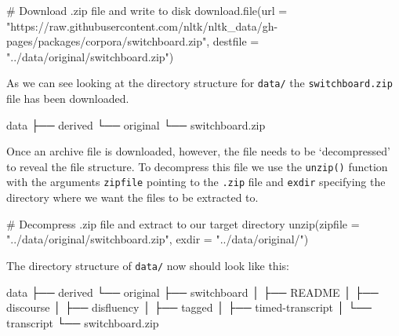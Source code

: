 \documentclass[
  letterpaper,
]{latex/krantz}
\newenvironment{Shaded}{\begin{snugshade}}{\end{snugshade}}
\newcommand{\AttributeTok}[1]{\textcolor[rgb]{0.40,0.45,0.13}{#1}}
\newcommand{\CommentTok}[1]{\textcolor[rgb]{0.37,0.37,0.37}{#1}}
\newcommand{\ExtensionTok}[1]{\textcolor[rgb]{0.00,0.23,0.31}{#1}}
\newcommand{\FunctionTok}[1]{\textcolor[rgb]{0.28,0.35,0.67}{#1}}
\newcommand{\NormalTok}[1]{\textcolor[rgb]{0.00,0.23,0.31}{#1}}
\newcommand{\StringTok}[1]{\textcolor[rgb]{0.13,0.47,0.30}{#1}}
\begin{document}
\begin{Shaded}
\begin{Highlighting}[]
\CommentTok{\# Download .zip file and write to disk}
\FunctionTok{download.file}\NormalTok{(}\AttributeTok{url =} \StringTok{"https://raw.githubusercontent.com/nltk/nltk\_data/gh{-}pages/packages/corpora/switchboard.zip"}\NormalTok{, }\AttributeTok{destfile =} \StringTok{"../data/original/switchboard.zip"}\NormalTok{)}
\end{Highlighting}
\end{Shaded}

As we can see looking at the directory structure for \texttt{data/} the
\texttt{switchboard.zip} file has been downloaded.

\begin{Shaded}
\begin{Highlighting}[]
\ExtensionTok{data}
\ExtensionTok{├──}\NormalTok{ derived}
\ExtensionTok{└──}\NormalTok{ original}
    \ExtensionTok{└──}\NormalTok{ switchboard.zip}
\end{Highlighting}
\end{Shaded}

Once an archive file is downloaded, however, the file needs to be
`decompressed' to reveal the file structure. To decompress this file we
use the \texttt{unzip()} function with the arguments \texttt{zipfile}
pointing to the \texttt{.zip} file and \texttt{exdir} specifying the
directory where we want the files to be extracted to.

\begin{Shaded}
\begin{Highlighting}[]
\CommentTok{\# Decompress .zip file and extract to our target directory}
\FunctionTok{unzip}\NormalTok{(}\AttributeTok{zipfile =} \StringTok{"../data/original/switchboard.zip"}\NormalTok{, }\AttributeTok{exdir =} \StringTok{"../data/original/"}\NormalTok{)}
\end{Highlighting}
\end{Shaded}

The directory structure of \texttt{data/} now should look like this:

\begin{Shaded}
\begin{Highlighting}[]
\ExtensionTok{data}
\ExtensionTok{├──}\NormalTok{ derived}
\ExtensionTok{└──}\NormalTok{ original}
    \ExtensionTok{├──}\NormalTok{ switchboard}
    \ExtensionTok{│}\NormalTok{   ├── README}
    \ExtensionTok{│}\NormalTok{   ├── discourse}
    \ExtensionTok{│}\NormalTok{   ├── disfluency}
    \ExtensionTok{│}\NormalTok{   ├── tagged}
    \ExtensionTok{│}\NormalTok{   ├── timed{-}transcript}
    \ExtensionTok{│}\NormalTok{   └── transcript}
    \ExtensionTok{└──}\NormalTok{ switchboard.zip}
\end{Highlighting}
\end{Shaded}
\end{document}
